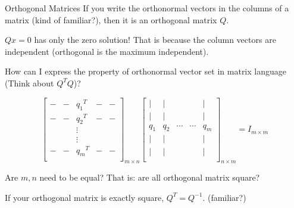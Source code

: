 \documentclass{beamer}
\begin{document}
\begin{frame}{Orthogonal Matrices}
If you write the orthonormal vectors in the columns of a matrix (kind of familiar?), then it is an orthogonal matrix $Q$.

\vspace{3pt}
$Qx=0$ has only the zero solution! That is because the column vectors are independent (orthogonal is the maximum independent).

\vspace{3pt}
How can I express the property of orthonormal vector set in matrix language (Think about $Q^TQ$)?


\begin{equation*}
    \left[ \begin{matrix}
        -&		-&		{q_1}^T&		-&		-\\
        -&		-&		{q_2}^T&		-&		-\\
        &		&		\vdots&		&		\\
        &		&		\vdots&		&		\\
        -&		-&		{q_m}^T&		-&		-\\
    \end{matrix} \right] _{m\times n}\left[ \begin{matrix}
        |&		|&		&		&		|\\
        |&		|&		&		&		|\\
        q_1&		q_2&		\cdots&		\cdots&		q_m\\
        |&		|&		&		&		|\\
        |&		|&		&		&		|\\
    \end{matrix} \right] _{n\times m}=I _{m\times m}
\end{equation*}

Are $m,n$ need to be equal? That is: are all orthogonal matrix square?

\vspace{3pt}
If your orthogonal matrix is exactly square, $Q^T=Q^{-1}$. (familiar?)
\end{frame}
\end{document}

